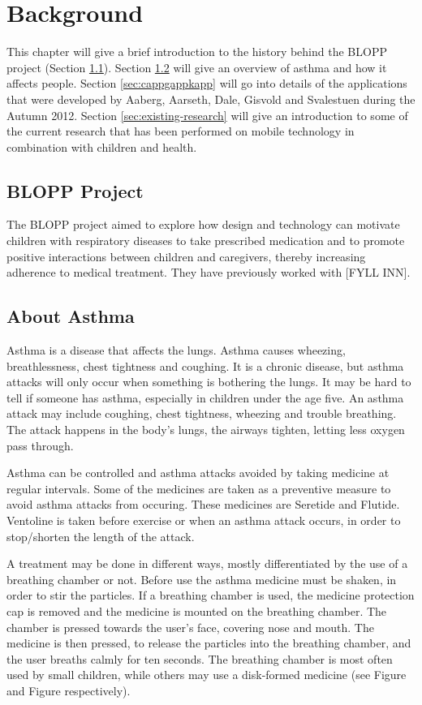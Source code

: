 \chapter{Background}
\label{chp:background}

This chapter will give a brief introduction to the history behind the BLOPP project (Section \ref{sec:bloppproject}). Section \ref{sec:about-asthma} will give an overview of asthma and how it affects people. Section \ref{sec:cappgappkapp} will go into details of the applications that were developed by Aaberg, Aarseth, Dale, Gisvold and Svalestuen during the Autumn 2012.     
Section \ref{sec:existing-research} will give an introduction to some of the current research that has been performed on mobile technology in combination with children and health.   


\section{BLOPP Project}
\label{sec:bloppproject}
The BLOPP project aimed to explore how design and technology can motivate children with respiratory diseases to take prescribed medication and to promote positive interactions between children and caregivers, thereby increasing adherence to medical treatment. They have previously worked with [FYLL INN].


\section{About Asthma}
\label{sec:about-asthma}
Asthma is a disease that affects the lungs. Asthma causes wheezing, breathlessness, chest tightness and coughing. It is a chronic disease, but asthma attacks will only occur when something is bothering the lungs. It may be hard to tell if someone has asthma, especially in children under the age five. 
An asthma attack may include coughing, chest tightness, wheezing and trouble breathing. The attack happens in the body's lungs, the airways tighten, letting less oxygen pass through.

Asthma can be controlled and asthma attacks avoided by taking medicine at regular intervals. Some of the medicines are taken as a preventive measure to avoid asthma attacks from occuring. These medicines are Seretide and Flutide. Ventoline is taken before exercise or when an asthma attack occurs, in order to stop/shorten the length of the attack. 

A treatment may be done in different ways, mostly differentiated by the use of a breathing chamber or not. Before use the asthma medicine must be shaken, in order to stir the particles. If a breathing chamber is used, the medicine protection cap is removed and the medicine is mounted on the breathing chamber. The chamber is pressed towards the user's face, covering nose and mouth. The medicine is then pressed, to release the particles into the breathing chamber, and the user breaths calmly for ten seconds. 
The breathing chamber is most often used by small children, while others may use a disk-formed medicine (see Figure and Figure respectively).


